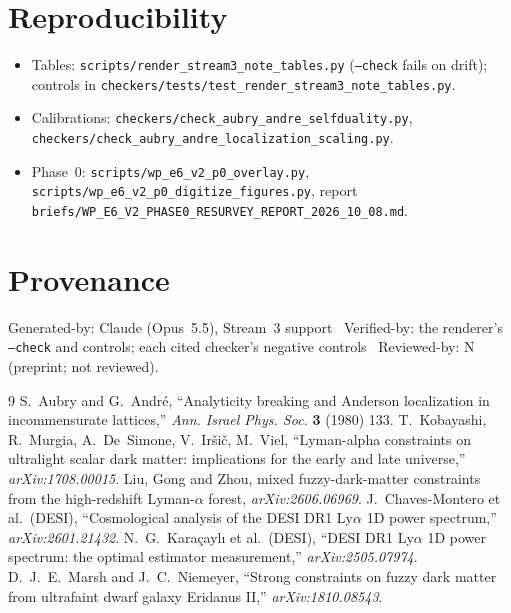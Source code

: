 \documentclass[11pt,a4paper]{article}
\begin{document}
\section*{Reproducibility}
\begin{itemize}\small
\item Tables: \nolinkurl{scripts/render_stream3_note_tables.py} (\texttt{--check} fails on drift); controls in
  \nolinkurl{checkers/tests/test_render_stream3_note_tables.py}.
\item Calibrations: \nolinkurl{checkers/check_aubry_andre_selfduality.py},
  \nolinkurl{checkers/check_aubry_andre_localization_scaling.py}.
\item Phase~0: \nolinkurl{scripts/wp_e6_v2_p0_overlay.py}, \nolinkurl{scripts/wp_e6_v2_p0_digitize_figures.py},
  report \nolinkurl{briefs/WP_E6_V2_PHASE0_RESURVEY_REPORT_2026_10_08.md}.
\end{itemize}

\section*{Provenance}
Generated-by: Claude (Opus~5.5), Stream~3 support \textbar\ Verified-by: the renderer's \texttt{--check} and
controls; each cited checker's negative controls \textbar\ Reviewed-by: N (preprint; not reviewed).

\begin{thebibliography}{9}
 S.~Aubry and G.~Andr\'e, ``Analyticity breaking and Anderson localization in incommensurate
  lattices,'' \textit{Ann. Israel Phys. Soc.} \textbf{3} (1980) 133.
 T.~Kobayashi, R.~Murgia, A.~De~Simone, V.~Ir\v{s}i\v{c}, M.~Viel, ``Lyman-alpha constraints on
  ultralight scalar dark matter: implications for the early and late universe,'' \textit{arXiv:1708.00015}.
 Liu, Gong and Zhou, mixed fuzzy-dark-matter constraints from the high-redshift Lyman-$\alpha$
  forest, \textit{arXiv:2606.06969}.
 J.~Chaves-Montero et al.\ (DESI), ``Cosmological analysis of the DESI DR1 Ly$\alpha$ 1D power
  spectrum,'' \textit{arXiv:2601.21432}.
 N.~G.~Kara\c{c}ayl\i{} et al.\ (DESI), ``DESI DR1 Ly$\alpha$ 1D power spectrum: the optimal
  estimator measurement,'' \textit{arXiv:2505.07974}.
 D.~J.~E.~Marsh and J.~C.~Niemeyer, ``Strong constraints on fuzzy dark matter from ultrafaint
  dwarf galaxy Eridanus II,'' \textit{arXiv:1810.08543}.
\end{thebibliography}
\end{document}
